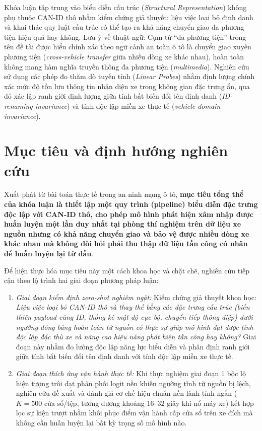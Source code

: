 \documentclass[12pt, a4paper, reqno, oneside]{book}
\newcommand\sect[1]{%
  \Needspace{5\baselineskip}%
  \phantomsection%
  \addcontentsline{toc}{section}{#1}%
  \section*{#1}%
}
\begin{document}
Khóa luận tập trung vào biểu diễn cấu trúc (\textit{Structural Representation}) không phụ thuộc CAN-ID thô nhằm kiểm chứng giả thuyết: liệu việc loại bỏ định danh và khai thác quy luật cấu trúc có thể tạo ra khả năng chuyển giao đa phương tiện hiệu quả hay không. Lưu ý về thuật ngữ: Cụm từ ``đa phương tiện'' trong tên đề tài được hiểu chính xác theo ngữ cảnh an toàn ô tô là chuyển giao xuyên phương tiện (\textit{cross-vehicle transfer} giữa nhiều dòng xe khác nhau), hoàn toàn không mang hàm nghĩa truyền thông đa phương tiện (\textit{multimedia}). Nghiên cứu sử dụng các phép đo thăm dò tuyến tính (\textit{Linear Probes}) nhằm định lượng chính xác mức độ tồn lưu thông tin nhận diện xe trong không gian đặc trưng ẩn, qua đó xác lập ranh giới định lượng giữa tính bất biến đổi tên định danh (\textit{ID-renaming invariance}) và tính độc lập miền xe thực tế (\textit{vehicle-domain invariance}).

\sect{Mục tiêu và định hướng nghiên cứu}
Xuất phát từ bài toán thực tế trong an ninh mạng ô tô, \textbf{mục tiêu tổng thể của khóa luận là thiết lập một quy trình (pipeline) biểu diễn đặc trưng độc lập với CAN-ID thô, cho phép mô hình phát hiện xâm nhập được huấn luyện một lần duy nhất tại phòng thí nghiệm trên dữ liệu xe nguồn nhưng có khả năng chuyển giao và bảo vệ được nhiều dòng xe khác nhau mà không đòi hỏi phải thu thập dữ liệu tấn công có nhãn để huấn luyện lại từ đầu}.

Để hiện thực hóa mục tiêu này một cách khoa học và chặt chẽ, nghiên cứu tiếp cận theo lộ trình hai giai đoạn phương pháp luận:
\begin{enumerate}
    \item \textit{Giai đoạn kiểm định zero-shot nghiêm ngặt:} Kiểm chứng giả thuyết khoa học: \textit{Liệu việc loại bỏ CAN-ID thô và thay thế bằng các đặc trưng cấu trúc (biến thiên payload cùng ID, thống kê mật độ cục bộ, chuyển tiếp thông điệp) dưới ngưỡng đóng băng hoàn toàn từ nguồn có thực sự giúp mô hình đạt được tính độc lập đặc thù xe và nâng cao hiệu năng phát hiện tấn công hay không?} Giai đoạn này nhằm đo lường độc lập năng lực biểu diễn và phân định ranh giới giữa tính bất biến đổi tên định danh với tính độc lập miền xe thực tế.
    \item \textit{Giai đoạn thích ứng vận hành thực tế:} Khi thực nghiệm giai đoạn 1 bộc lộ hiện tượng trôi dạt phân phối logit nền khiến ngưỡng tĩnh từ nguồn bị lệch, nghiên cứu đề xuất và đánh giá cơ chế hiệu chuẩn nền lành tính ngắn ($K=500$ cửa sổ/tệp, tương đương khoảng $16\text{--}32$ giây khi nổ máy xe) kết hợp lọc sự kiện trượt nhằm khôi phục điểm vận hành cấp cửa sổ trên xe đích mà không cần huấn luyện lại bất kỳ trọng số mô hình nào.
\end{enumerate}
\end{document}
